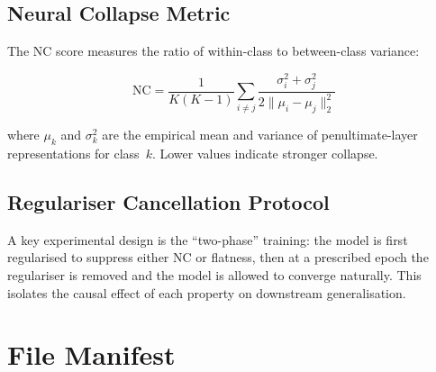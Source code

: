 \documentclass[11pt,a4paper]{article}
\theoremstyle{definition}
\begin{document}
\subsection{Neural Collapse Metric}
The NC score measures the ratio of within-class to between-class variance:

\[
\text{NC} = \frac{1}{K(K-1)} \sum_{i \neq j} \frac{\sigma_i^2 + \sigma_j^2}{2\|\mu_i - \mu_j\|_2^2}
\]

where $\mu_k$ and $\sigma_k^2$ are the empirical mean and variance of penultimate-layer
representations for class~$k$. Lower values indicate stronger collapse.

\subsection{Regulariser Cancellation Protocol}
A key experimental design is the ``two-phase'' training: the model is first regularised
to suppress either NC or flatness, then at a prescribed epoch the regulariser is removed
and the model is allowed to converge naturally. This isolates the causal effect of each
property on downstream generalisation.

\section{File Manifest}
\end{document}

